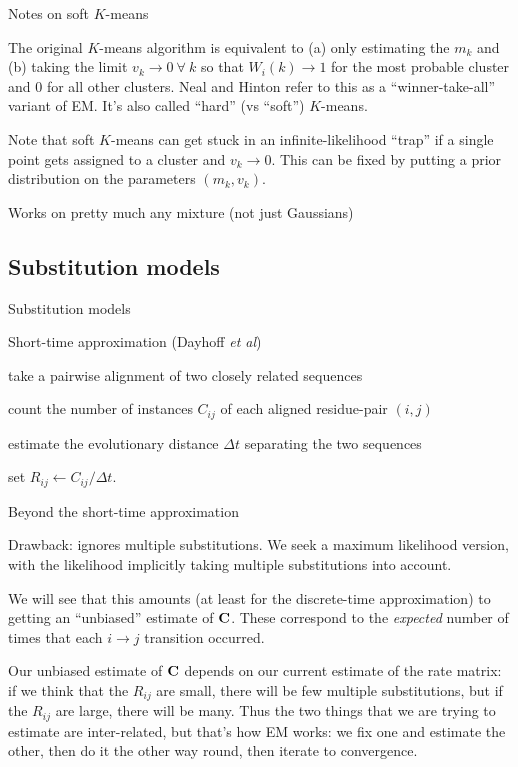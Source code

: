 \documentclass{beamer}
\begin{document}
\begin{frame}{Notes on soft $K$-means}

\itemb
 \item The original $K$-means algorithm is equivalent to (a) only estimating the $m_k$ and (b) taking the limit $v_k \to 0\ \forall\ k$ so that $W_i(k) \to 1$ for the most probable cluster and $0$ for all other clusters.
Neal and Hinton refer to this as a ``winner-take-all'' variant of EM. It's also called ``hard'' (vs ``soft'') $K$-means.
 \item Note that soft $K$-means can get stuck in an infinite-likelihood ``trap'' if a single point gets assigned to a cluster and $v_k \to 0$.
This can be fixed by putting a prior distribution on the parameters $(m_k,v_k)$.
 \item Works on pretty much any mixture (not just Gaussians)
\iteme

\end{frame}


\subsection{Substitution models}

\begin{frame}{Substitution models}

Short-time approximation (Dayhoff {\em et al})
\itemb
\item take a pairwise alignment of two closely related sequences
\item count the number of instances $C_{ij}$ of each aligned residue-pair $(i,j)$
\item estimate the evolutionary distance $\Delta t$ separating the two sequences
\item set $R_{ij} \leftarrow C_{ij} / \Delta t$.
\iteme
\end{frame}

\begin{frame}{Beyond the short-time approximation}
 \itemb
 \item Drawback: ignores multiple substitutions. We seek a maximum likelihood version,
with the likelihood implicitly taking multiple substitutions into account.
 \item We will see that this amounts (at least for the discrete-time approximation)
to getting an ``unbiased'' estimate of ${\bf C}$.
These correspond to the {\em expected} number of times that each $i \to j$ transition occurred.
 \item Our unbiased estimate of ${\bf C}$ depends on our current estimate of the rate matrix:
if we think that the $R_{ij}$ are small, there will be few multiple substitutions,
but if the $R_{ij}$ are large, there will be many.
Thus the two things that we are trying to estimate are inter-related, but that's how EM works:
we fix one and estimate the other, then do it the other way round, then iterate to convergence.
 \iteme
\end{frame}
\end{document}
